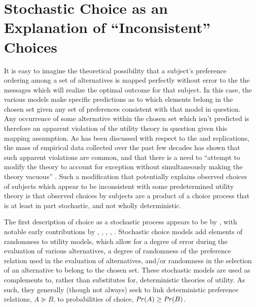 \documentclass[../main.tex]{subfiles}
\begin{document}
\section{Stochastic Choice as an Explanation of \enquote{Inconsistent} Choices}

It is easy to imagine the theoretical possibility that a subject's preference ordering among a set of alternatives is mapped perfectly without error to the the messages which will realize the optimal outcome for that subject.
In this case, the various models make specific predictions as to which elements belong in the chosen set given any set of preferences consistent with that model in question.
Any occurrence of some alternative within the chosen set which isn't predicted is therefore an apparent violation of the utility theory in question given this mapping assumption.
As has been discussed with respect to the \textcite{Grether1979} and \textcite{Holt2002} replications, the mass of empirical data collected over the past few decades has shown that such apparent violations are common, and that there is a need to \enquote{attempt to modify the theory to account for  exception without simultaneously making the theory vacuous} \textcite[634]{Grether1979}.
Such a modification that potentially explains observed choices of subjects which appear to be inconsistent with some predetermined utility theory is that observed choices by subjects are a product of a choice process that is at least in part stochastic, and not wholly deterministic.


The first description of choice as a stochastic process appears to be by \textcite{Edwards1954}, with notable early contributions by \textcite{Luce1958}, \textcite{Debreu1958}, \textcite{Davidson1959}, \textcite{Becker1963}, \textcite{Luce1965}.
Stochastic choice models add elements of randomness to utility models, which allow for a degree of error during the evaluation of various alternatives, a degree of randomness of the preference relation used  in the evaluation of alternatives, and/or randomness in the selection of an alternative to belong to the chosen set.
These stochastic models are used as complements to, rather than substitutes for, deterministic theories of utility.
As such, they generally (though not always) seek to link deterministic preference relations, $A \succeq B$, to probabilities of choice, ${\mathit{Pr}}(A) \geq {\ensuremath{\mathit{Pr}}}(B)$.
\end{document}
